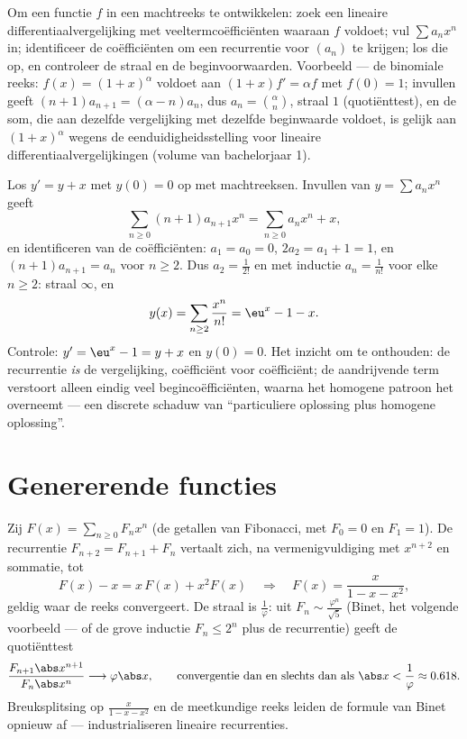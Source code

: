 \begin{method}\label{met:b2:powerseries:ode}
Om een functie $f$ in een machtreeks te ontwikkelen: zoek een
lineaire differentiaalvergelijking met veeltermcoëfficiënten
waaraan $f$ voldoet; vul $\sum a_nx^n$ in; identificeer de
coëfficiënten om een recurrentie voor $(a_n)$ te krijgen; los die
op, en controleer de straal en de beginvoorwaarden. Voorbeeld ---
de binomiale reeks: $f(x) = (1+x)^\alpha$ voldoet aan $(1+x)f' =
\alpha f$ met $f(0) = 1$; invullen geeft $(n+1)a_{n+1} = (\alpha -
n)a_n$, dus $a_n = \binom{\alpha}{n}$, straal $1$ (quotiënttest),
en de som, die aan dezelfde vergelijking met dezelfde beginwaarde
voldoet, is gelijk aan $(1 + x)^\alpha$ wegens de
eenduidigheidsstelling voor lineaire differentiaalvergelijkingen
(volume van bachelorjaar 1).
\end{method}

\begin{example}\label{ex:b2:powerseries:odeforced}
Los $y' = y + x$ met $y(0) = 0$ op met machtreeksen. Invullen van
$y = \sum a_nx^n$ geeft
\[
\sum_{n\geq0}(n+1)a_{n+1}x^n
= \sum_{n\geq0}a_nx^n + x ,
\]
en identificeren van de coëfficiënten: $a_1 = a_0 = 0$, $2a_2 = a_1
+ 1 = 1$, en $(n+1)a_{n+1} = a_n$ voor $n \geq 2$. Dus $a_2 =
\frac{1}{2!}$ en met inductie $a_n = \frac{1}{n!}$ voor elke $n
\geq 2$: straal $\infty$, en
\[
y(x) = \sum_{n\geq2}\frac{x^n}{n!} = \eu^x - 1 - x .
\]
Controle: $y' = \eu^x - 1 = y + x$ en $y(0) = 0$. Het inzicht om te
onthouden: de recurrentie \emph{is} de vergelijking, coëfficiënt
voor coëfficiënt; de aandrijvende term verstoort alleen eindig veel
begincoëfficiënten, waarna het homogene patroon het overneemt ---
een discrete schaduw van ``particuliere oplossing plus homogene
oplossing''.
\end{example}

\section{Genererende functies}

\begin{example}[Fibonacci]\label{ex:b2:powerseries:fibonacci}
Zij $F(x) = \sum_{n\geq0} F_n x^n$ (de getallen van Fibonacci, met
$F_0 = 0$ en $F_1 = 1$). De recurrentie $F_{n+2} = F_{n+1} + F_n$
vertaalt zich, na vermenigvuldiging met $x^{n+2}$ en sommatie, tot
\[
F(x) - x = x\,F(x) + x^2 F(x)
\quad\Longrightarrow\quad
F(x) = \frac{x}{1 - x - x^2} ,
\]
geldig waar de reeks convergeert. De straal is
$\frac{1}{\varphi}$: uit $F_n \sim \frac{\varphi^n}{\sqrt5}$
(Binet, het volgende voorbeeld --- of de grove inductie $F_n \leq
2^n$ plus de recurrentie) geeft de quotiënttest
\[
\frac{F_{n+1}\abs x^{n+1}}{F_n\abs x^n}
\longrightarrow \varphi\abs x ,
\qquad\text{convergentie dan en slechts dan als } \abs x <
\frac1\varphi \approx 0.618 .
\] Breuksplitsing op
$\frac{x}{1 - x - x^2}$ en de meetkundige reeks leiden de formule
van Binet opnieuw af ---  industrialiseren
lineaire recurrenties.
\end{example}

